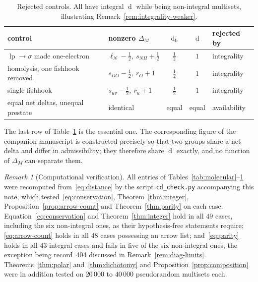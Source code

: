 \documentclass[11pt]{article}
\numberwithin{equation}{section}
\newcommand{\lp}{\operatorname{lp}}
\newcommand{\del}{\operatorname{d}}
\newcommand{\code}[1]{\texttt{#1}}
\theoremstyle{plain}
\theoremstyle{definition}
\theoremstyle{remark}
\newtheorem{remark}[theorem]{Remark}
\begin{document}
\begin{table}[htbp]
\centering
\footnotesize
\setlength{\tabcolsep}{5pt}
\caption{Rejected controls.  All have integral $\del$ while being non-integral
multisets, illustrating Remark~\ref{rem:integrality-weaker}.}
\label{tab:controls}
\begin{tabular}{@{}l l c c l@{}}
\toprule
control & nonzero $\Delta_M$ & $\del_{\mathrm b}$ & $\del$ & rejected by \\
\midrule
$\lp\to\sigma$ made one-electron
  & $\ell_N{-}\tfrac12,\ s_{NH}{+}\tfrac12$ & $\tfrac12$ & $1$ & integrality \\
homolysis, one fishhook removed
  & $s_{OO}{-}\tfrac12,\ r_O{+}1$ & $\tfrac12$ & $1$ & integrality \\
single fishhook
  & $s_{uv}{-}\tfrac12,\ r_u{+}1$ & $\tfrac12$ & $1$ & integrality \\
equal net deltas, unequal prestate
  & identical & equal & equal & availability \\
\bottomrule
\end{tabular}
\end{table}

The last row of Table~\ref{tab:controls} is the essential one.  The
corresponding figure of the companion manuscript is constructed precisely so
that two groups share a net delta and differ in admissibility; they therefore
share $\del$ exactly, and no function of $\Delta_M$ can separate them.

\begin{remark}[Computational verification]
\label{rem:verification}
All entries of Tables~\ref{tab:molecular}--\ref{tab:controls} were recomputed
from~\eqref{eq:distance} by the script \code{cd\_check.py} accompanying this
note, which tested~\eqref{eq:conservation}, Theorem~\ref{thm:integer},
Proposition~\ref{prop:arrow-count} and Theorem~\ref{thm:parity} on each case.
Equation~\eqref{eq:conservation} and Theorem~\ref{thm:integer} hold in all $49$
cases, including the six non-integral ones, as their hypothesis-free
statements require; \eqref{eq:arrow-count} holds in all $48$ cases possessing
an arrow list; and~\eqref{eq:parity} holds in all $43$ integral cases and fails
in five of the six non-integral ones, the exception being record~404 discussed
in Remark~\ref{rem:diag-limits}.  Theorems~\ref{thm:polar}
and~\ref{thm:dichotomy} and Proposition~\ref{prop:composition} were in
addition tested on $20\,000$ to $40\,000$ pseudorandom multisets each.
\end{remark}
\end{document}
